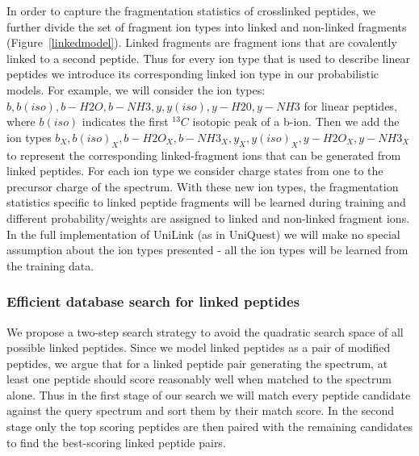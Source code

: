 In order to capture the fragmentation statistics of crosslinked peptides, we further divide the set of fragment ion types into linked and non-linked fragments (Figure~\ref{linkedmodel}). Linked fragments are fragment ions that are covalently linked to a second peptide.  Thus for every ion type that is used to describe linear peptides we introduce its corresponding linked ion type in our probabilistic models.  For example, we will consider the ion types:  $b, b(iso), b-H2O, b-NH3, y, y(iso), y-H20, y-NH3$ for linear peptides, where $b(iso)$ indicates the first $^{13}C$ isotopic peak of a b-ion. Then we add the ion types $b_{X}, b(iso)_{X}, b-H2O_{X}, b-NH3_{X}, y_{X}, y(iso)_{X}, y-H2O_{X}, y-NH3_{X}$ to represent the corresponding linked-fragment ions that can be generated from linked peptides. For each ion type we consider charge states from one to the precursor charge of the  spectrum.  With these new ion types, the fragmentation statistics specific to linked peptide fragments will be learned during training and different probability/weights are assigned to linked and non-linked fragment ions.  In the full implementation of UniLink (as in UniQuest) we will make no special assumption about the ion types presented \-- all the ion types will be learned from the training data.

\subsubsection{Efficient database search for linked peptides}

We propose a two-step search strategy to avoid the quadratic search space of all possible linked peptides.  Since we model linked peptides as a pair of modified peptides, 
we argue that for a linked peptide pair generating the  spectrum, at least one peptide should score reasonably well when matched to the spectrum alone. Thus in the first stage of our search we will match every peptide candidate against the query spectrum and sort them by their match score.  In the second stage only the top scoring peptides are then paired with the remaining candidates to find the best-scoring linked peptide pairs.  


